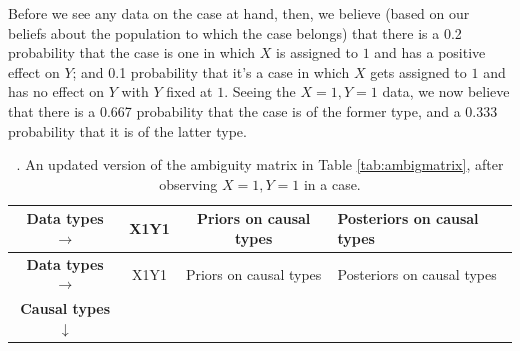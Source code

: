 \documentclass[12pt,]{book}
\begin{document}
Before we see any data on the case at hand, then, we believe (based on our beliefs about the population to which the case belongs) that there is a 0.2 probability that the case is one in which \(X\) is assigned to \(1\) and has a positive effect on \(Y\); and 0.1 probability that it's a case in which \(X\) gets assigned to \(1\) and has no effect on \(Y\) with \(Y\) fixed at \(1\). Seeing the \(X=1, Y=1\) data, we now believe that there is a 0.667 probability that the case is of the former type, and a 0.333 probability that it is of the latter type.

\begin{longtable}[]{@{}cccl@{}}
\caption{\label{tab:ambigupdate}. An updated version of the ambiguity matrix in Table \ref{tab:ambigmatrix}, after observing \(X=1, Y=1\) in a case.}\tabularnewline
\toprule
\begin{minipage}[b]{0.31\columnwidth}\centering
\textbf{Data types} \(\rightarrow\)\strut
\end{minipage} & \begin{minipage}[b]{0.06\columnwidth}\centering
X1Y1\strut
\end{minipage} & \begin{minipage}[b]{0.24\columnwidth}\centering
Priors on causal types\strut
\end{minipage} & \begin{minipage}[b]{0.28\columnwidth}\raggedright
Posteriors on causal types\strut
\end{minipage}\tabularnewline
\midrule
\endfirsthead
\toprule
\begin{minipage}[b]{0.31\columnwidth}\centering
\textbf{Data types} \(\rightarrow\)\strut
\end{minipage} & \begin{minipage}[b]{0.06\columnwidth}\centering
X1Y1\strut
\end{minipage} & \begin{minipage}[b]{0.24\columnwidth}\centering
Priors on causal types\strut
\end{minipage} & \begin{minipage}[b]{0.28\columnwidth}\raggedright
Posteriors on causal types\strut
\end{minipage}\tabularnewline
\midrule
\endhead
\begin{minipage}[t]{0.31\columnwidth}\centering
\textbf{Causal types} \(\downarrow\)\strut
\end{minipage} & \begin{minipage}[t]{0.06\columnwidth}\centering
\strut
\end{minipage} & \begin{minipage}[t]{0.24\columnwidth}\centering

\end{minipage}
\end{longtable}
\end{document}
